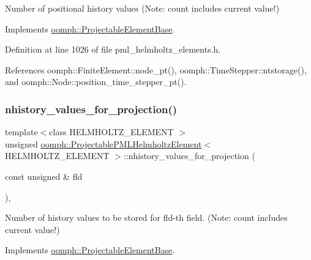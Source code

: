 Number of positional history values (Note\+: count includes current value!) 



Implements \hyperlink{classoomph_1_1ProjectableElementBase_ab4ecd0cd24000a3ed675dc7198203c1f}{oomph\+::\+Projectable\+Element\+Base}.



Definition at line 1026 of file pml\+\_\+helmholtz\+\_\+elements.\+h.



References oomph\+::\+Finite\+Element\+::node\+\_\+pt(), oomph\+::\+Time\+Stepper\+::ntstorage(), and oomph\+::\+Node\+::position\+\_\+time\+\_\+stepper\+\_\+pt().

\mbox{\label{classoomph_1_1ProjectablePMLHelmholtzElement_a5b0bad4b386bf0d31aeccb963e0814a0}} 
\subsubsection{\texorpdfstring{nhistory\+\_\+values\+\_\+for\+\_\+projection()}{nhistory\_values\_for\_projection()}}
{\footnotesize\ttfamily template$<$class H\+E\+L\+M\+H\+O\+L\+T\+Z\+\_\+\+E\+L\+E\+M\+E\+NT $>$ \\
unsigned \hyperlink{classoomph_1_1ProjectablePMLHelmholtzElement}{oomph\+::\+Projectable\+P\+M\+L\+Helmholtz\+Element}$<$ H\+E\+L\+M\+H\+O\+L\+T\+Z\+\_\+\+E\+L\+E\+M\+E\+NT $>$\+::nhistory\+\_\+values\+\_\+for\+\_\+projection (\begin{DoxyParamCaption}\item[{const unsigned \&}]{fld }\end{DoxyParamCaption})\hspace{0.3cm}{\ttfamily [inline]}, {\ttfamily [virtual]}}



Number of history values to be stored for fld-\/th field. (Note\+: count includes current value!) 



Implements \hyperlink{classoomph_1_1ProjectableElementBase_ac6790f394630b964663281f8740f43a5}{oomph\+::\+Projectable\+Element\+Base}.



